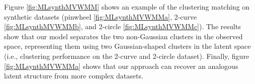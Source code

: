 \documentclass[]{article}
\begin{document}
Figure \ref{fig:MLsynthMVWMM} shows an example of the clustering matching on synthetic datasets (pinwheel \ref{fig:MLsynthMVWMMa}, 2-curve \ref{fig:MLsynthMVWMMb}, and 2-circle \ref{fig:MLsynthMVWMMc}). The results show that our model separates the two non-Gaussian clusters in the observed space, representing them using two Gaussian-shaped clusters in the latent space (i.e., clustering performance on the 2-curve and 2-circle dataset). Finally, figure \ref{fig:MLsynthMVWMMa} shows that our approach can recover an analogous latent structure from more complex datasets.
\begin{figure}[ht!]
	\centering

\end{figure}
\end{document}
